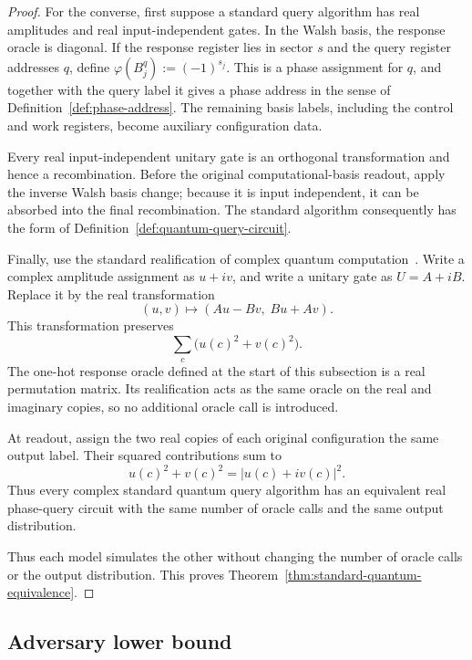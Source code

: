\documentclass[11pt]{article}
\numberwithin{equation}{section}
\theoremstyle{remark}
\begin{document}
\begin{proof}
For the converse, first suppose a standard query algorithm has real amplitudes and real input-independent gates. In the Walsh basis, the response oracle is diagonal. If the response register lies in sector $s$ and the query register addresses $q$, define $\varphi(B_j^q):=(-1)^{s_j}$. This is a phase assignment for $q$, and together with the query label it gives a phase address in the sense of Definition~\ref{def:phase-address}. The remaining basis labels, including the control and work registers, become auxiliary configuration data.

Every real input-independent unitary gate is an orthogonal transformation and
hence a recombination. Before the original computational-basis readout,
apply the inverse Walsh basis change; because it is input independent, it can
be absorbed into the final recombination. The standard algorithm consequently has the form of
Definition~\ref{def:quantum-query-circuit}.

Finally, use the standard realification of complex quantum computation~\cite{BernsteinVazirani1997,Aharonov2003}. Write a complex amplitude assignment as $u+iv$, and write a unitary gate as $U=A+iB$. Replace it by the real transformation
\begin{equation}
    (u,v)
    \longmapsto
    (Au-Bv,\;Bu+Av).
\end{equation}
This transformation preserves
\begin{equation}
    \sum_c\bigl(u(c)^2+v(c)^2\bigr).
\end{equation}
The one-hot response oracle defined at the start of this subsection is a real permutation matrix. Its realification acts as the same oracle on the real and imaginary copies, so no additional oracle call is introduced.

At readout, assign the two real copies of each original configuration the
same output label. Their squared contributions sum to
\begin{equation}
    u(c)^2+v(c)^2
    =
    |u(c)+iv(c)|^2.
\end{equation}
Thus every complex standard quantum query algorithm has an equivalent real
phase-query circuit with the same number of oracle calls and the same output
distribution.

Thus each model simulates the other without changing the number of oracle calls or the output distribution. This proves Theorem~\ref{thm:standard-quantum-equivalence}.
\end{proof}


\subsection{Adversary lower bound}
\label{app:adversary-lower-bound}
\end{document}
